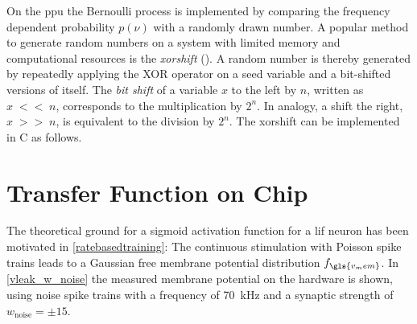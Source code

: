 On the \gls{ppu} the Bernoulli process is implemented by comparing the frequency dependent probability $p(\nu)$ with a randomly drawn number. A popular method to generate random numbers on a system with limited memory and computational resources is the \emph{xorshift} (\citealp{marsaglia2003xorshift}). A random number is thereby generated by repeatedly applying the XOR operator on a seed variable and a bit-shifted versions of itself. The \emph{bit shift} of a variable $x$ to the left by $n$, written as $x\;{\scriptstyle<<}\;n$, corresponds to the multiplication by $2^n$. In analogy, a shift the right, $x\;{\scriptstyle>>}\;n$, is equivalent to the division by $2^n$. The xorshift can be implemented in C as follows.


\section{Transfer Function on Chip}
The theoretical ground for a sigmoid activation function for a \gls{lif} neuron has been motivated in \cref{ratebasedtraining}: The continuous stimulation with Poisson spike trains leads to a Gaussian free membrane potential distribution $f_{\gls{v_mem}}$. In \cref{vleak_w_noise} the measured membrane potential on the hardware is shown, using noise spike trains with a frequency of \SI{70}{\kilo \Hz} and a synaptic strength of $w_\text{noise}= \pm 15$.

